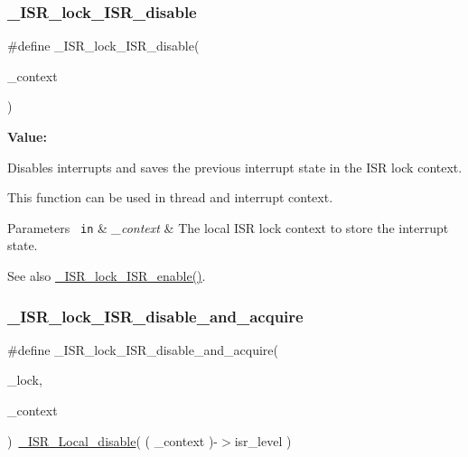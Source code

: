 \subsubsection{\texorpdfstring{\_ISR\_lock\_ISR\_disable}{\_ISR\_lock\_ISR\_disable}}
{\footnotesize\ttfamily \#define \+\_\+\+I\+S\+R\+\_\+lock\+\_\+\+I\+S\+R\+\_\+disable(\begin{DoxyParamCaption}\item[{}]{\+\_\+context }\end{DoxyParamCaption})}

{\bfseries Value\+:}
\begin{DoxyCode}{0}
\DoxyCodeLine{\textcolor{keywordflow}{do} \{ \(\backslash\)}

\end{DoxyCode}


Disables interrupts and saves the previous interrupt state in the I\+SR lock context. 

This function can be used in thread and interrupt context.


\begin{DoxyParams}[1]{Parameters}
\mbox{\texttt{ in}}  & {\em \+\_\+context} & The local I\+SR lock context to store the interrupt state.\\
\hline
\end{DoxyParams}
\begin{DoxySeeAlso}{See also}
\mbox{\hyperlink{group__RTEMSScoreISRLocks_ga2a9af8c6d9bdc4c652759c84df115559}{\+\_\+\+I\+S\+R\+\_\+lock\+\_\+\+I\+S\+R\+\_\+enable()}}. 
\end{DoxySeeAlso}
\mbox{\label{group__RTEMSScoreISRLocks_gaa4ecfcd40e90531bdd3c348a99b3b7d9}} 
\subsubsection{\texorpdfstring{\_ISR\_lock\_ISR\_disable\_and\_acquire}{\_ISR\_lock\_ISR\_disable\_and\_acquire}}
{\footnotesize\ttfamily \#define \+\_\+\+I\+S\+R\+\_\+lock\+\_\+\+I\+S\+R\+\_\+disable\+\_\+and\+\_\+acquire(\begin{DoxyParamCaption}\item[{}]{\+\_\+lock,  }\item[{}]{\+\_\+context }\end{DoxyParamCaption})~\mbox{\hyperlink{group__RTEMSScoreISR_ga2a829f51f98576aa596562985e1df2fc}{\+\_\+\+I\+S\+R\+\_\+\+Local\+\_\+disable}}( ( \+\_\+context )-\/$>$isr\+\_\+level )}



